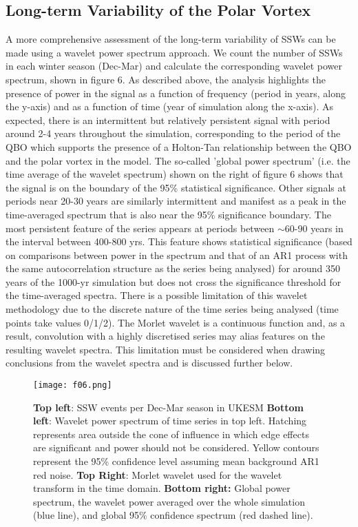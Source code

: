 \documentclass[wcd, manuscript]{copernicus}
\begin{document}

\subsection{Long-term Variability of the Polar Vortex}
A more comprehensive assessment of the long-term variability of SSWs can be made using a wavelet power spectrum approach. We count the number of SSWs in each winter season (Dec-Mar) and calculate the corresponding wavelet power spectrum, shown in figure 6. As described above, the analysis highlights the presence of power in the signal as a function of frequency (period in years, along the y-axis) and as a function of time (year of simulation along the x-axis). As expected, there is an intermittent but relatively persistent signal with period around 2-4 years throughout the simulation, corresponding to the period of the QBO which supports the presence of a Holton-Tan relationship between the QBO and the polar vortex in the model. The so-called 'global power spectrum' (i.e. the time average of the wavelet spectrum) shown on the right of figure 6 shows that the signal is on the boundary of the 95\% statistical significance. Other signals at periods near 20-30 years are similarly intermittent and manifest as a peak in the time-averaged spectrum that is also near the 95\% significance boundary. The most persistent feature of the series appears at periods between $\sim$60-90 years in the interval between 400-800 yrs. This feature shows statistical significance (based on comparisons between power in the spectrum and that of an AR1 process with the same autocorrelation structure as the series being analysed) for around 350 years of the 1000-yr simulation but does not cross the significance threshold for the time-averaged spectra. There is a possible limitation of this wavelet methodology due to the discrete nature of the time series being analysed (time points take values 0/1/2). The Morlet wavelet is a continuous function and, as a result, convolution with a highly discretised series may alias features on the resulting wavelet spectra. This limitation must be considered when drawing conclusions from the wavelet spectra and is discussed further below.

\begin{center}
\begin{figure}[h!]
\noindent\texttt{[image: f06.png]}
\caption{\textbf{Top left}: SSW events per Dec-Mar season in UKESM \textbf{Bottom left}: Wavelet power spectrum of time series in top left. Hatching represents area outside the cone of influence in which edge effects are significant and power should not be considered. Yellow contours represent the 95\% confidence level assuming mean background AR1 red noise. \textbf{Top Right}: Morlet wavelet used for the wavelet transform in the time domain. \textbf{Bottom right:} Global power spectrum, the wavelet power averaged over the whole simulation (blue line), and global 95\% confidence spectrum (red dashed line).}
\label{fig3}
\end{figure}
\end{center}
\end{document}
